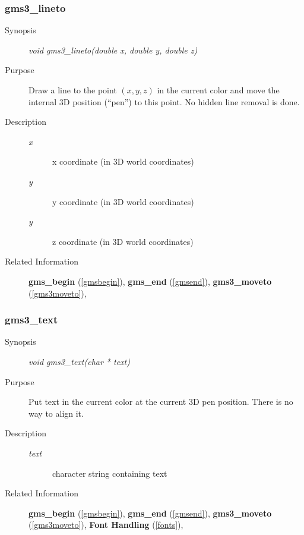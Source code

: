 \subsubsection{gms3\_lineto\label{gms3lineto}}
\begin{description}
\item[Synopsis]\mbox{}


{\em void    gms3\_lineto(double x, double y, double z)\/}
\item[Purpose]\mbox{}


Draw a line to the point $(x,y,z)$ in the  current color and
move the internal 3D  position (``pen'') to this point.
No hidden line removal is done.
\item[Description]\mbox{}


\begin{description}
\item[{\em x\/}]\mbox{}

 x coordinate (in 3D world coordinates)
\item[{\em y\/}]\mbox{}

 y coordinate (in 3D world coordinates)
\item[{\em y\/}]\mbox{}

 z coordinate (in 3D world coordinates)
\end{description}

\item[Related Information]\mbox{}


{\bf gms\_begin} (\ref{gmsbegin}), 
{\bf gms\_end} (\ref{gmsend}), 
{\bf gms3\_moveto} (\ref{gms3moveto}),
\end{description}


\newpage





\subsubsection{gms3\_text\label{gms3text}}
\begin{description}
\item[Synopsis]\mbox{}


{\em void    gms3\_text(char * text)\/}
\item[Purpose]\mbox{}


Put text in the  current color at the current 3D pen position.
There is no way to align it.
\item[Description]\mbox{}


\begin{description}
\item[{\em text\/}]\mbox{}

 character string containing text
\end{description}

\item[Related Information]\mbox{}


{\bf gms\_begin} (\ref{gmsbegin}), 
{\bf gms\_end} (\ref{gmsend}), 
{\bf gms3\_moveto} (\ref{gms3moveto}), 
{\bf Font Handling} (\ref{fonts}), 
\end{description}





